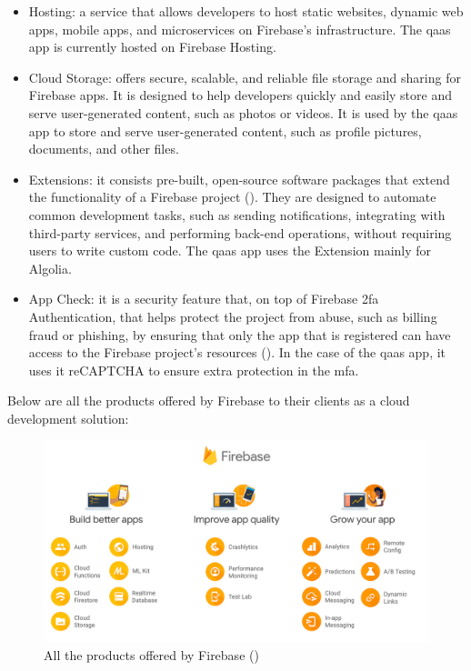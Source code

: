 \begin{itemize}
      \item Hosting: a service that allows developers to host static websites, dynamic web apps, mobile apps, and
            microservices on Firebase's infrastructure. The \acrshort{qaas} app is currently hosted on Firebase
            Hosting.
      \item Cloud Storage: offers secure, scalable, and reliable file storage and sharing for Firebase apps.
            It is designed to help developers quickly and easily store and serve user-generated content, such as
            photos or videos. It is used by the \acrshort{qaas} app to store and serve user-generated content, such as
            profile pictures, documents, and other files.
      \item Extensions: it consists pre-built, open-source software packages that extend the functionality of a Firebase
            project (\textit{\cite{firebaseExtension}}). They are designed to automate common development tasks, such as
            sending notifications, integrating with third-party services, and performing back-end operations, without
            requiring users to write custom code. The \acrshort{qaas} app uses the Extension mainly for Algolia.
      \item App Check: it is a security feature that, on top of Firebase \acrshort{2fa} Authentication, that helps protect
            the project from abuse, such as billing fraud or phishing, by ensuring that only the app that is registered
            can have access to the Firebase project's resources (\textit{\cite{appCheckFirebase}}). In the case of the
            \acrshort{qaas} app, it uses it \gls{reCAPTCHA} to ensure extra protection in the \acrshort{mfa}.
\end{itemize}

Below are all the products offered by Firebase to their clients as a cloud development solution:

\begin{figure}[H]
      \centering
      \includegraphics[width=1.0\textwidth]{Figures/Firebase.png}
      \caption{All the products offered by Firebase (\textit{\cite{firebasePic}})}
\end{figure}

